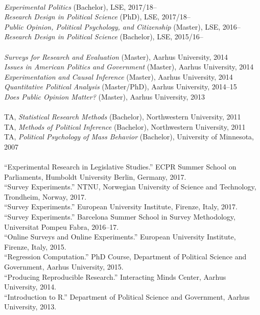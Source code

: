 \documentclass[12pt]{article}
\renewcommand{\section}[1]{\pagebreak[3]%
    \llap{\scshape\smash{\parbox[t]{\marginparwidth}{\raggedright {\color{lg}#1}}}}%
    \vspace{-\baselineskip}\par}
\newcommand{\topic}[1]{\pagebreak[3]\indent {\color{lg}{\footnotesize #1 }}\\}
\newcommand{\entry}[1]{\indent {\color{lg}\guillemotright}\hspace{2pt}#1\vspace{.25em}\\}
\begin{document}
\section{Teaching \&\\ Advising}
\topic{Lecturing: London School of Economics and Political Science}
	\entry{\textit{Experimental Politics} (Bachelor), LSE, 2017/18--}
	\entry{\textit{Research Design in Political Science} (PhD), LSE, 2017/18--}
	\entry{\textit{Public Opinion, Political Psychology, and Citizenship} (Master), LSE, 2016--}
	\entry{\textit{Research Design in Political Science} (Bachelor), LSE, 2015/16--}

\topic{Lecturing: Aarhus University}
	\entry{\textit{Surveys for Research and Evaluation} (Master), Aarhus University, 2014}
	\entry{\textit{Issues in American Politics and Government} (Master), Aarhus University, 2014}
	\entry{\textit{Experimentation and Causal Inference} (Master), Aarhus University, 2014}
	\entry{\textit{Quantitative Political Analysis} (Master/PhD), Aarhus University, 2014--15}
	\entry{\textit{Does Public Opinion Matter?} (Master), Aarhus University, 2013}

\topic{Class Teaching: Northwestern University}
	\entry{TA, \textit{Statistical Research Methods} (Bachelor), Northwestern University, 2011} %
	\entry{TA, \textit{Methods of Political Inference} (Bachelor), Northwestern University, 2011} %
	\entry{TA, \textit{Political Psychology of Mass Behavior} (Bachelor), University of Minnesota, 2007} %

\topic{Short courses}
	\entry{``Experimental Research in Legislative Studies.'' ECPR Summer School on Parliaments, Humboldt University Berlin, Germany, 2017.}
    \entry{``Survey Experiments.'' NTNU, Norwegian University of Science and Technology, Trondheim, Norway, 2017.}
	\entry{``Survey Experiments.'' European University Institute, Firenze, Italy, 2017.}
	\entry{``Survey Experiments.'' Barcelona Summer School in Survey Methodology, Universitat Pompeu Fabra, 2016--17.}
	\entry{``Online Surveys and Online Experiments.'' European University Institute, Firenze, Italy, 2015.}
	\entry{``Regression Computation.'' PhD Course, Department of Political Science and Government, Aarhus University, 2015.}
	\entry{``Producing Reproducible Research.'' Interacting Minds Center, Aarhus University, 2014.}
	\entry{``Introduction to R.'' Department of Political Science and Government, Aarhus University, 2013.}
\end{document}

